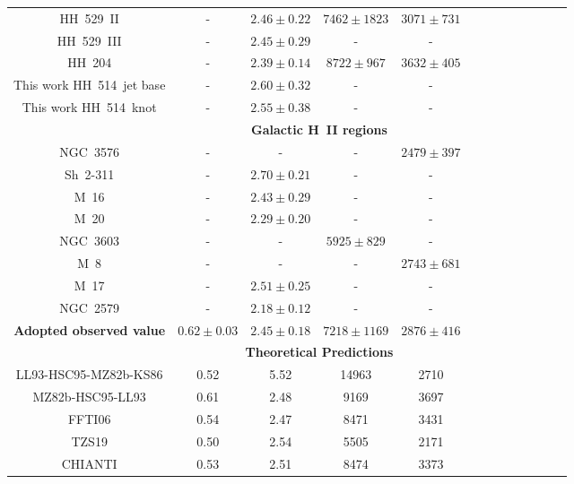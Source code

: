 \documentclass[fleqn,usenatbib]{mnras}
\begin{document}
\begin{table}
\begin{tabular}{ccccccccccccc}
\citet{mendez2021} HH~529~II &-&$2.46 \pm 0.22$&$7462 \pm 1823$&$3071 \pm 731$\\

\citet{mendez2021} HH~529~III &-&$2.45 \pm 0.29$ & - & -\\


\citet{mendez2021-2} HH~204 & - & $2.39 \pm 0.14$ & $8722 \pm 967$ & $3632 \pm 405$\\

This work HH~514~jet base & - & $2.60 \pm 0.32$ &-&-\\

This work HH~514~knot & - & $2.55 \pm 0.38$ &-&-\\

 & \multicolumn{4}{c}{{\bf Galactic H~II regions}}\\

\citet{garciarojas04} NGC~3576 & -& - & - & $2479 \pm 397$ \\

\citet{garciarojas05} Sh~2-311& - & $2.70\pm 0.21$&-&-\\

\citet{garciarojas06} M~16 &-&$ 2.43\pm 0.29$&-&-\\

\citet{garciarojas06} M~20 & -& $ 2.29\pm 0.20$&-&-\\

\citet{garciarojas06} NGC~3603 & - & - & $5925 \pm 829$ & - \\

\citet{garciarojas07-2} M~8 &-& - &- & $2743 \pm 681$  \\

\citet{garciarojas07-2} M~17 &-& $2.51 \pm 0.25$ &-&-\\

\citet{Esteban13} NGC~2579 &- &$2.18 \pm 0.12$ &-&-\\



{\bf Adopted observed value} & \boldmath $0.62 \pm 0.03$ & \boldmath $2.45 \pm 0.18$& \boldmath$ 7218\pm 1169$ & \boldmath $2876\pm416$\\

 & \multicolumn{4}{c}{{\bf Theoretical Predictions}}\\

LL93-HSC95-MZ82b-KS86 &0.52& 5.52&14963&2710\\

MZ82b-HSC95-LL93  & 0.61 & 2.48 &9169&3697\\

FFTI06 &0.54& 2.47&8471&3431\\

TZS19 & 0.50 & 2.54&5505&2171\\

CHIANTI & 0.53 & 2.51&8474&3373\\

\hline
\end{tabular}
\end{table}
\end{document}
